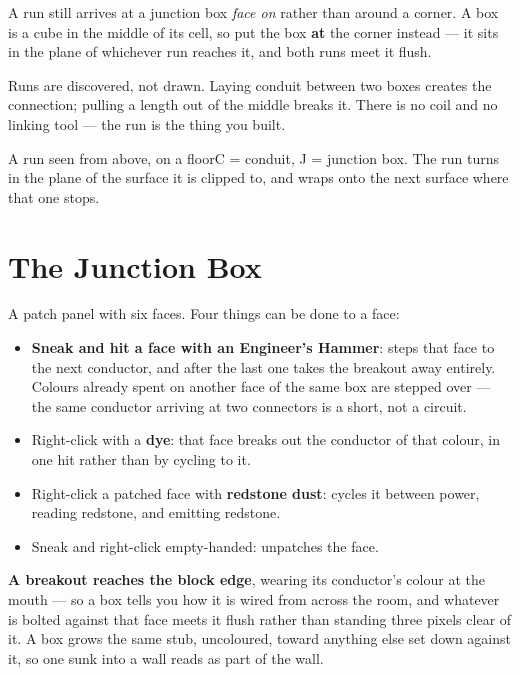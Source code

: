A run still arrives at a junction box \emph{face on} rather than around a corner. A box is a cube in
the middle of its cell, so put the box \textbf{at} the corner instead --- it sits in the plane of
whichever run reaches it, and both runs meet it flush.

Runs are discovered, not drawn. Laying conduit between two boxes creates the connection; pulling a
length out of the middle breaks it. There is no coil and no linking tool --- the run is the thing
you built.

\begin{mbplan}{A run seen from above, on a floor}{C = conduit, J = junction box. The run turns in
the plane of the surface it is clipped to, and wraps onto the next surface where that one stops.}
\end{mbplan}

\section{The Junction Box}

A patch panel with six faces. Four things can be done to a face:

\begin{itemize}
\item \textbf{Sneak and hit a face with an Engineer's Hammer}: steps that face to the next
      conductor, and after the last one takes the breakout away entirely. Colours already spent on
      another face of the same box are stepped over --- the same conductor arriving at two
      connectors is a short, not a circuit.
\item Right-click with a \textbf{dye}: that face breaks out the conductor of that colour, in one hit
      rather than by cycling to it.
\item Right-click a patched face with \textbf{redstone dust}: cycles it between power, reading
      redstone, and emitting redstone.
\item Sneak and right-click empty-handed: unpatches the face.
\end{itemize}

\textbf{A breakout reaches the block edge}, wearing its conductor's colour at the mouth --- so a box
tells you how it is wired from across the room, and whatever is bolted against that face meets it
flush rather than standing three pixels clear of it. A box grows the same stub, uncoloured, toward
anything else set down against it, so one sunk into a wall reads as part of the wall.

